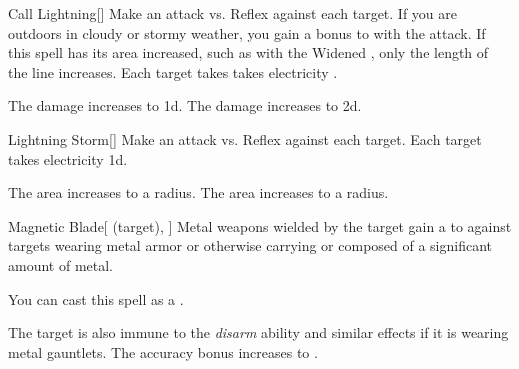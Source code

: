 \lowercase{\hypertarget{spell:Call Lightning}{}}\label{spell:Call Lightning}
\begin{freeability}[Rank 3]{\hypertarget{spell:Call Lightning}{Call Lightning}}[]
Make an attack vs. Reflex against each target.
If you are outdoors in cloudy or stormy weather, you gain a  bonus to  with the attack.
If this spell has its area increased, such as with the Widened , only the length of the line increases.
\hit Each target takes takes electricity .


\rankline
{} The damage increases to  \plus1d.
 The damage increases to  \plus2d.
\end{freeability}
\vspace{0.25em}



\lowercase{\hypertarget{spell:Lightning Storm}{}}\label{spell:Lightning Storm}
\begin{freeability}[Rank 3]{\hypertarget{spell:Lightning Storm}{Lightning Storm}}[]
Make an attack vs. Reflex against each target.
\hit Each target takes electricity  \minus1d.

\rankline
{} The area increases to a \arealarge radius.
 The area increases to a \areahuge radius.
\end{freeability}
\vspace{0.25em}



\lowercase{\hypertarget{spell:Magnetic Blade}{}}\label{spell:Magnetic Blade}
\begin{attuneability}[Rank 3]{\hypertarget{spell:Magnetic Blade}{Magnetic Blade}}[ (target), ]
Metal weapons wielded by the target gain a   to  against targets wearing metal armor or otherwise carrying or composed of a significant amount of metal.

You can cast this spell as a .

\rankline
{} The target is also immune to the \textit{disarm} ability and similar effects if it is wearing metal gauntlets.
 The accuracy bonus increases to .
\end{attuneability}
\vspace{0.25em}



